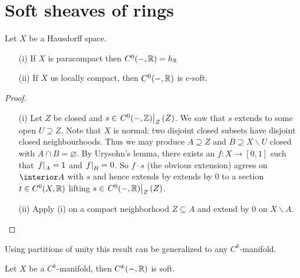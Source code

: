 \documentclass[../main.tex]{subfiles}
\begin{document}
\chapter{Soft sheaves of rings}

\begin{prop}
    Let $X$ be a Hausdorff space.
    \begin{enumerate}
        \item[(i)] If $X$ is paracompact then $C^0(-, \mathbb{R}) = h_{\mathbb{R}}$
        \item[(ii)] If $X$ us locally compact, then $C^0(-, \mathbb{R})$ is c-soft.
    \end{enumerate}
\end{prop}

\begin{proof} \leavevmode
    \begin{enumerate}
        \item[(i)] Let $Z$ be closed and $s\in \left.C^0(-, \mathbb{Z})\right|_{Z}(Z)$. We saw that $s$ extends to some open $U\supseteq Z$. Note that $X$ is normal: two disjoint closed subsets have disjoint closed neighbourhoods. Thus we may produce $A\supseteq Z$ and $B\supseteq X\backslash U$ closed with $A\cap B = \varnothing$. By Urysohn's lemma, there exists an $f\colon X\to [0,1]$ such that $\left.f\right|_{A} = 1$ and $\left.f\right|_{B} = 0$. So $f\cdot s$ (the obvious extension) agrees on $\interior A$ with $s$ and hence extends by extends by $0$ to a section $t\in C^0(X, \mathbb{R})$ lifting $s\in \left.C^0(-, \mathbb{R})\right|_{Z}(Z)$. 
        \item[(ii)] Apply (i) on a compact neighborhood $Z\subseteq A$ and extend by $0$ on $X\backslash A$. \qedhere
    \end{enumerate}
\end{proof}

Using partitions of unity this result can be generalized to any $C^k$-manifold.

\begin{prop}
    Let $X$ be a $C^k$-manifold, then $C^k(-, \mathbb{R})$ is soft.
\end{prop}
\end{document}
